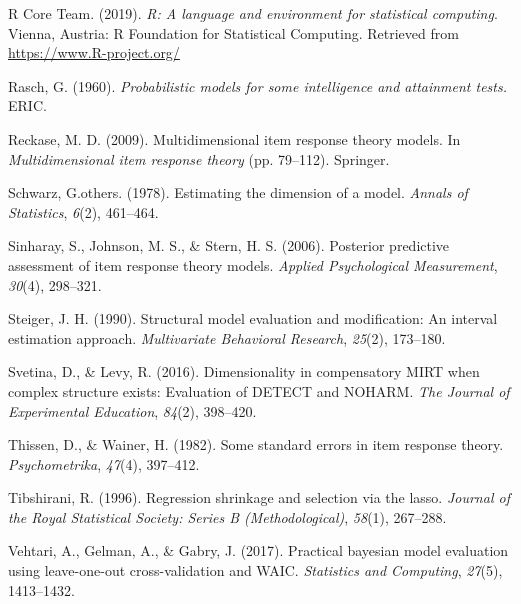 \documentclass[
  english,
  man,floatsintext]{apa7}
\newlength{\cslhangindent}
\newlength{\cslentryspacingunit} %
\newenvironment{CSLReferences}[2] %
 {%
  \setlength{\parindent}{0pt}
  \ifodd #1
  \let\oldpar\par
  \def\par{\hangindent=\cslhangindent\oldpar}
  \fi
  \setlength{\parskip}{#2\cslentryspacingunit}
 }%
 {}
\begin{document}
\begin{CSLReferences}{1}{0}
\leavevmode{}%
R Core Team. (2019). \emph{R: A language and environment for statistical computing}. Vienna, Austria: R Foundation for Statistical Computing. Retrieved from \url{https://www.R-project.org/}

\leavevmode{}%
Rasch, G. (1960). \emph{Probabilistic models for some intelligence and attainment tests.} ERIC.

\leavevmode{}%
Reckase, M. D. (2009). Multidimensional item response theory models. In \emph{Multidimensional item response theory} (pp. 79--112). Springer.

\leavevmode{}%
Schwarz, G.others. (1978). Estimating the dimension of a model. \emph{Annals of Statistics}, \emph{6}(2), 461--464.

\leavevmode{}%
Sinharay, S., Johnson, M. S., \& Stern, H. S. (2006). Posterior predictive assessment of item response theory models. \emph{Applied Psychological Measurement}, \emph{30}(4), 298--321.

\leavevmode{}%
Steiger, J. H. (1990). Structural model evaluation and modification: An interval estimation approach. \emph{Multivariate Behavioral Research}, \emph{25}(2), 173--180.

\leavevmode{}%
Svetina, D., \& Levy, R. (2016). Dimensionality in compensatory MIRT when complex structure exists: Evaluation of DETECT and NOHARM. \emph{The Journal of Experimental Education}, \emph{84}(2), 398--420.

\leavevmode{}%
Thissen, D., \& Wainer, H. (1982). Some standard errors in item response theory. \emph{Psychometrika}, \emph{47}(4), 397--412.

\leavevmode{}%
Tibshirani, R. (1996). Regression shrinkage and selection via the lasso. \emph{Journal of the Royal Statistical Society: Series B (Methodological)}, \emph{58}(1), 267--288.

\leavevmode{}%
Vehtari, A., Gelman, A., \& Gabry, J. (2017). Practical bayesian model evaluation using leave-one-out cross-validation and WAIC. \emph{Statistics and Computing}, \emph{27}(5), 1413--1432.


\end{CSLReferences}
\end{document}
